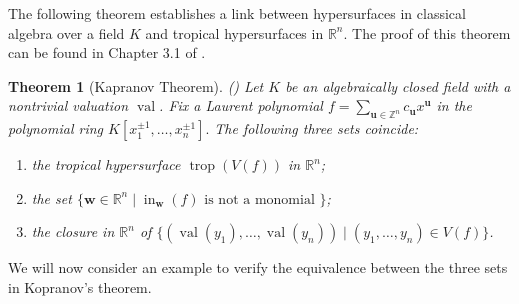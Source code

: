 \documentclass[11pt,reqno,a4paper]{article}
\theoremstyle{theoremstyle}
\newtheorem{theorem}{Theorem}[subsection]
\theoremstyle{examplestyle}
\theoremstyle{algorithmstyle}
\numberwithin{equation}{subsection}
\newcommand{\RR}{\mathbb{R}}
\newcommand{\ZZ}{\mathbb{Z}}
\DeclareMathOperator{\trop}{trop}
\DeclareMathOperator{\val}{val}
\DeclareMathOperator{\initial}{in}
\begin{document}
The following theorem establishes a link between hypersurfaces in classical algebra over a field $K$ and tropical hypersurfaces in $\RR^n$. The proof of this theorem can be found in Chapter 3.1 of \cite{MS2015}.

\begin{theorem}[Kapranov Theorem] \label{Thm:Kapranov}
    (\cite[Thm. 3.1.3]{MS2015}) Let $K$ be an algebraically closed field with a nontrivial valuation $\val$. Fix a Laurent polynomial $f = \sum_{\mathbf{u}\in\ZZ^n}c_{\mathbf{u}}x^{\mathbf{u}}$ in the polynomial ring $K[x_1^{\pm1},\ldots,x_n^{\pm1}].$ The following three sets coincide:
    \begin{enumerate}
        \item[(1)] the tropical hypersurface $\trop(V(f))$ in $\RR^n$;
        \item[(2)] the set $\{\mathbf{w}\in\RR^n\; | \; \initial_{\mathbf{w}}(f) \text{ is not a monomial }\}$;
        \item[(3)] the closure in $\RR^n$ of $\{(\val(y_1),\ldots,\val(y_n)) \; | \; (y_1,\ldots,y_n)\in V(f) \}$.
    \end{enumerate}
    
\end{theorem}

We will now consider an example to verify the equivalence between the three sets in Kopranov's theorem.
\end{document}
